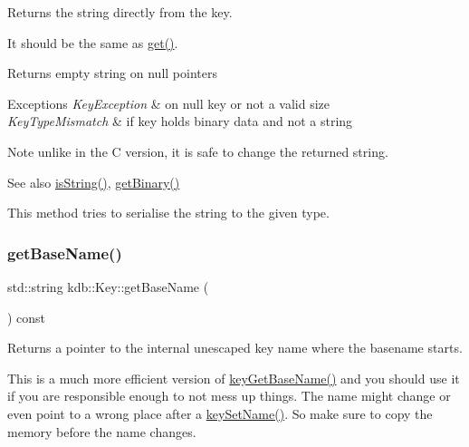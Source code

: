 \begin{DoxyReturn}{Returns}
the string directly from the key.
\end{DoxyReturn}
It should be the same as \mbox{\hyperlink{classkdb_1_1Key_ac558a1f1b2cb50d77fbabcbb24950c05}{get()}}. \begin{DoxyReturn}{Returns}
empty string on null pointers
\end{DoxyReturn}

\begin{DoxyExceptions}{Exceptions}
{\em Key\+Exception} & on null key or not a valid size \\
\hline
{\em Key\+Type\+Mismatch} & if key holds binary data and not a string\\
\hline
\end{DoxyExceptions}
\begin{DoxyNote}{Note}
unlike in the C version, it is safe to change the returned string.
\end{DoxyNote}
\begin{DoxySeeAlso}{See also}
\mbox{\hyperlink{classkdb_1_1Key_a2170b1d9decef951b478454e3ee0b618}{is\+String()}}, \mbox{\hyperlink{classkdb_1_1Key_ada114aba31b321ddc984018b43a8568b}{get\+Binary()}}
\end{DoxySeeAlso}
This method tries to serialise the string to the given type. \mbox{\label{classkdb_1_1Key_ab998c6e1b121b956653f01df5762aed8}} 
\subsubsection{\texorpdfstring{getBaseName()}{getBaseName()}}
{\footnotesize\ttfamily std\+::string kdb\+::\+Key\+::get\+Base\+Name (\begin{DoxyParamCaption}{ }\end{DoxyParamCaption}) const\hspace{0.3cm}{\ttfamily [inline]}}



Returns a pointer to the internal unescaped key name where the {\ttfamily basename} starts. 

This is a much more efficient version of \mbox{\hyperlink{group__keyname_ga0992d26bcfca767cb8e77053a483eb64}{key\+Get\+Base\+Name()}} and you should use it if you are responsible enough to not mess up things. The name might change or even point to a wrong place after a \mbox{\hyperlink{group__keyname_ga7699091610e7f3f43d2949514a4b35d9}{key\+Set\+Name()}}. So make sure to copy the memory before the name changes.

